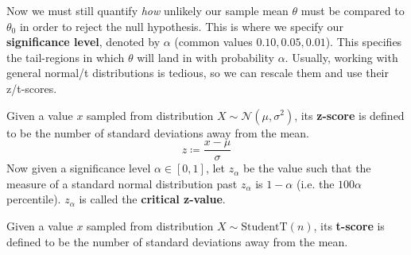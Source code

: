   Now we must still quantify \textit{how} unlikely our sample mean $\theta$ must be compared to $\theta_0$ in order to reject the null hypothesis. This is where we specify our \textbf{significance level}, denoted by $\alpha$ (common values $0.10, 0.05, 0.01$). This specifies the tail-regions in which $\theta$ will land in with probability $\alpha$. Usually, working with general normal/t distributions is tedious, so we can rescale them and use their z/t-scores. 

  \begin{definition}[Z-score]
    Given a value $x$ sampled from distribution $X \sim \mathcal{N}(\mu, \sigma^2)$, its \textbf{z-score} is defined to be the number of standard deviations away from the mean. 
    \begin{equation}
      z \coloneqq \frac{x - \mu}{\sigma}
    \end{equation}
    Now given a significance level $\alpha \in [0, 1]$, let $z_\alpha$ be the value such that the measure of a standard normal distribution past $z_\alpha$ is $1 - \alpha$ (i.e. the $100\alpha$ percentile). $z_\alpha$ is called the \textbf{critical z-value}.
  \end{definition}

  \begin{definition}[T-score]
    Given a value $x$ sampled from distribution $X \sim \mathrm{StudentT}(n)$, its \textbf{t-score} is defined to be the number of standard deviations away from the mean. 
  \end{definition}


